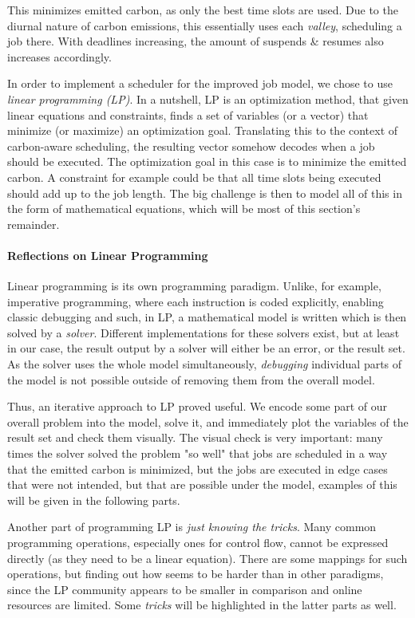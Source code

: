 This minimizes emitted carbon, as only the best time slots are used.
Due to the diurnal nature of carbon emissions, this essentially uses each \emph{valley}, scheduling a job there. 
With deadlines increasing, the amount of suspends \& resumes also increases accordingly.

In order to implement a scheduler for the improved job model, we chose to use \emph{linear programming (LP)}.
In a nutshell, LP is an optimization method, that given linear equations and constraints, finds a set of variables (or a vector) that minimize (or maximize) an optimization goal.
Translating this to the context of carbon-aware scheduling, the resulting vector somehow decodes when a job should be executed.
The optimization goal in this case is to minimize the emitted carbon. 
A constraint for example could be that all time slots being executed should add up to the job length. 
The big challenge is then to model all of this in the form of mathematical equations, which will be most of this section's remainder.

\paragraph{Reflections on Linear Programming}

Linear programming is its own programming paradigm. Unlike, for example, imperative programming, where each instruction is coded explicitly, enabling classic debugging and such, in LP, a mathematical model is written which is then solved by a \emph{solver}. 
Different implementations for these solvers exist, but at least in our case, the result output by a solver will either be an error, or the result set. 
As the solver uses the whole model simultaneously, \emph{debugging} individual parts of the model is not possible outside of removing them from the overall model.

Thus, an iterative approach to LP proved useful. 
We encode some part of our overall problem into the model, solve it, and immediately plot the variables of the result set and check them visually.
The visual check is very important: many times the solver solved the problem "so well" that jobs are scheduled in a way that the emitted carbon is minimized, but the jobs are executed in edge cases that were not intended, but that are possible under the model, examples of this will be given in the following parts.

Another part of programming LP is \emph{just knowing the tricks}. 
Many common programming operations, especially ones for control flow, cannot be expressed directly (as they need to be a linear equation).
There are some mappings for such operations, but finding out how seems to be harder than in other paradigms, since the LP community appears to be smaller in comparison and online resources are limited.
Some \emph{tricks} will be highlighted in the latter parts as well. 

